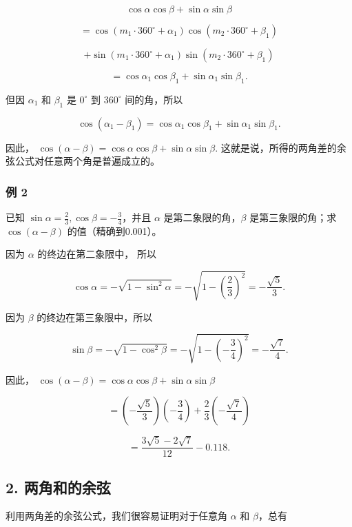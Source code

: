 \[
\cos \alpha \cos \beta + \sin \alpha \sin \beta
\]

\[
= \cos \left(m _ {1} \cdot 360 ^{\circ} + \alpha_ {1}\right) \cos \left(m _ {2} \cdot 360 ^{\circ} + \beta_ {1}\right)
\]

\[
+ \sin \left(m _ {1} \cdot 360 ^{\circ} + \alpha_ {1}\right) \sin \left(m _ {2} \cdot 360 ^{\circ} + \beta_ {1}\right)
\]

\[
= \cos \alpha_ {1} \cos \beta_ {1} + \sin \alpha_ {1} \sin \beta_ {1}.
\]

但因 \(\alpha_{1}\) 和 \(\beta_{1}\) 是 \(0^{\circ}\) 到 \(360^{\circ}\)
间的角，所以

\[
\cos \left(\alpha_ {1} - \beta_ {1}\right) = \cos \alpha_ {1} \cos \beta_ {1} + \sin \alpha_ {1} \sin \beta_ {1}.
\]

因此，
\(\cos (\alpha -\beta) = \cos \alpha \cos \beta +\sin \alpha \sin \beta .\)
这就是说，所得的两角差的余弦公式对任意两个角是普遍成立的。

\subsubsection{例 2}

已知 \(\sin \alpha = \frac{2}{3}, \cos \beta = -\frac{3}{4}\)，并且
\(\alpha\) 是第二象限的角，\(\beta\) 是第三象限的角；求
\(\cos (\alpha - \beta)\) 的值（精确到0.001）。

 因为 \(\alpha\) 的终边在第二象限中， 所以

\[
\cos \alpha = - \sqrt {1 - \sin^ {2} \alpha} = - \sqrt {1 - \left(\frac {2}{3}\right) ^ {2}} = - \frac {\sqrt {5}}{3}.
\]

因为 \(\beta\) 的终边在第三象限中，所以

\[
\sin \beta = - \sqrt {1 - \cos^ {2} \beta} = - \sqrt {1 - \left(- \frac {3}{4}\right) ^ {2}} = - \frac {\sqrt {7}}{4}.
\]

因此，
\(\cos (\alpha -\beta) = \cos \alpha \cos \beta +\sin \alpha \sin \beta\)

\[
= \left(- \frac {\sqrt {5}}{3}\right) \left(- \frac {3}{4}\right) + \frac {2}{3} \left(- \frac {\sqrt {7}}{4}\right)
\]

\[
= \frac {3 \sqrt {5} - 2 \sqrt {7}}{12} - 0.118.
\]

\subsection{2. 两角和的余弦}

利用两角差的余弦公式，我们很容易证明对于任意角 \(\alpha\) 和
\(\beta\)，总有

